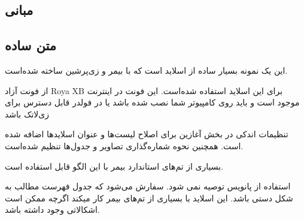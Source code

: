 \documentclass[xcolor=dvipsnames, professionalfonts, aspectratio=169, 11pt]{beamer}
\begin{document}
\begin{persian}
\everypar{\rightskip\rightmargin}
\section{مبانی}
\subsection{متن ساده}
\begin{frame}

این یک نمونه بسیار ساده از اسلاید است که با بیمر و زی‌پرشین ساخته شده‌است.

از فونت آزاد Roya XB برای این اسلاید استفاده شده‌است. این فونت در اینترنت موجود است و باید روی کامپیوتر شما نصب شده باشد یا در فولدر قابل دسترس برای زی‌لاتک باشد

تنظیمات اندکی در بخش آغازین برای اصلاح لیست‌ها و عنوان اسلایدها اضافه شده است. همچنین نحوه شماره‌گذاری تصاویر و جدول‌ها تنظیم شده‌است.

بسیاری از تم‌های استاندارد بیمر با این الگو قابل استفاده است.

استفاده از پانویس توصیه نمی شود. سفارش می‌شود که جدول فهرست مطالب به شکل دستی باشد. این اسلاید با بسیاری از تم‌های بیمر کار میکند اگرچه ممکن است اشکالاتی وجود داشته باشد.
\end{frame}


\end{persian}
\end{document}
